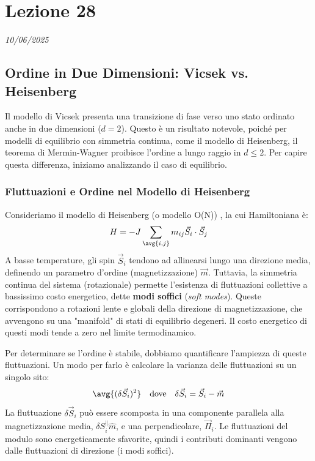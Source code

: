 \chapter{Lezione 28}
\label{capitolo_28}
\textit{10/06/2025}


\section{Ordine in Due Dimensioni: Vicsek vs. Heisenberg}

Il modello di Vicsek presenta una transizione di fase verso uno stato ordinato anche in due dimensioni ($d=2$). Questo è un risultato notevole, poiché per modelli di equilibrio con simmetria continua, come il modello di Heisenberg, il teorema di Mermin-Wagner proibisce l'ordine a lungo raggio in $d \le 2$. Per capire questa differenza, iniziamo analizzando il caso di equilibrio.

\subsection{Fluttuazioni e Ordine nel Modello di Heisenberg}
Consideriamo il modello di Heisenberg (o modello O(N)) , la cui Hamiltoniana è:
\begin{equation}
    H = -J \sum_{\avg{i,j}} m_{ij} \vec{S}_i \cdot \vec{S}_j
\end{equation}
A basse temperature, gli spin $\vec{S}_i$ tendono ad allinearsi lungo una direzione media, definendo un parametro d'ordine (magnetizzazione) $\vec{m}$. Tuttavia, la simmetria continua del sistema (rotazionale) permette l'esistenza di fluttuazioni collettive a bassissimo costo energetico, dette \textbf{modi soffici} (\textit{soft modes}). Queste corrispondono a rotazioni lente e globali della direzione di magnetizzazione, che avvengono su una "manifold" di stati di equilibrio degeneri. Il costo energetico di questi modi tende a zero nel limite termodinamico.

Per determinare se l'ordine è stabile, dobbiamo quantificare l'ampiezza di queste fluttuazioni. Un modo per farlo è calcolare la varianza delle fluttuazioni su un singolo sito:
\begin{equation}
    \avg{(\delta\vec{S}_i)^2} \quad \text{dove} \quad \delta\vec{S}_i = \vec{S}_i - \vec{m}
\end{equation}
La fluttuazione $\delta\vec{S}_i$ può essere scomposta in una componente parallela alla magnetizzazione media, $\delta S_i^\parallel \hat{m}$, e una perpendicolare, $\vec{\Pi}_i$. Le fluttuazioni del modulo sono energeticamente sfavorite, quindi i contributi dominanti vengono dalle fluttuazioni di direzione (i modi soffici).

